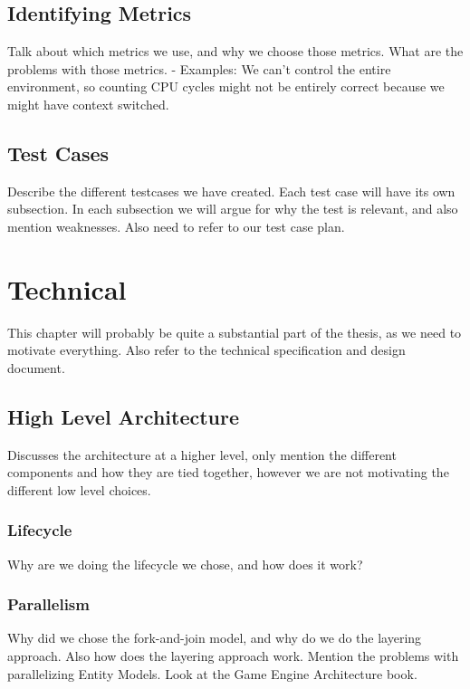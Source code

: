 \section{Identifying Metrics}
Talk about which metrics we use, and why we choose those metrics.
What are the problems with those metrics.
- Examples: We can't control the entire environment, so counting CPU cycles might not be entirely correct because we might have context switched.

\section{Test Cases}
Describe the different testcases we have created. Each test case will have its own subsection.
In each subsection we will argue for why the test is relevant, and also mention weaknesses.
Also need to refer to our test case plan.

\chapter{Technical}
\label{chap:technical}
This chapter will probably be quite a substantial part of the thesis, as we need to motivate everything.
Also refer to the technical specification and design document.

\section{High Level Architecture}
Discusses the architecture at a higher level, only mention the different components and how they are tied together,
however we are not motivating the different low level choices.

\subsection{Lifecycle}
Why are we doing the lifecycle we chose, and how does it work?

\subsection{Parallelism}
Why did we chose the fork-and-join model, and why do we do the layering approach.
Also how does the layering approach work.
Mention the problems with parallelizing Entity Models.
Look at the Game Engine Architecture book.

